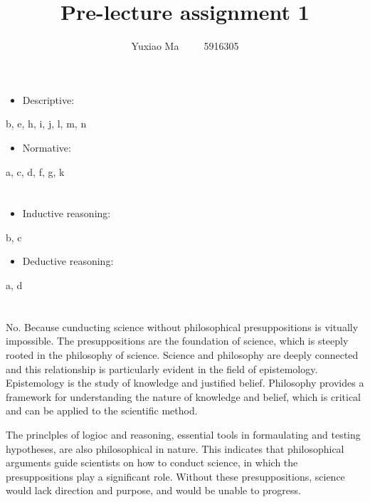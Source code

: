\documentclass[UTF8,a4paper,AutoFakeBold,AutoFakeSlant]{article}
\title{\textbf{\textsf{{\textsf{Pre-lecture assignment 1}}}}}
\author{\tnewroman Yuxiao Ma~~~~~5916305}
\date{}
\begin{document}
\maketitle


\section{}

\begin{itemize}
	\item Descriptive:
\end{itemize}

b, e, h, i, j, l, m, n

\begin{itemize}
	\item Normative:
\end{itemize}

a, c, d, f, g, k


\section{}

\begin{itemize}
	\item Inductive reasoning:
\end{itemize}

b, c

\begin{itemize}
	\item Deductive reasoning:
\end{itemize}

a, d


\section{}

No. Because cunducting science without philosophical presuppositions is vitually impossible.
The presuppositions are the foundation of science, which is steeply rooted in the philosophy of science.
Science and philosophy are deeply connected 
and this relationship is particularly evident in the field of epistemology.
Epistemology is the study of knowledge and justified belief. Philosophy provides
a framework for understanding the nature of knowledge and belief, which is critical and can be applied to the scientific method.

The princlples of logioc and reasoning, essential tools in formaulating and testing hypotheses, are also philosophical in nature.
This indicates that philosophical arguments guide scientists on how to conduct science, in which the presuppositions play a significant role.
Without these presuppositions, science would lack direction and purpose, and would be unable to progress.
\end{document}
